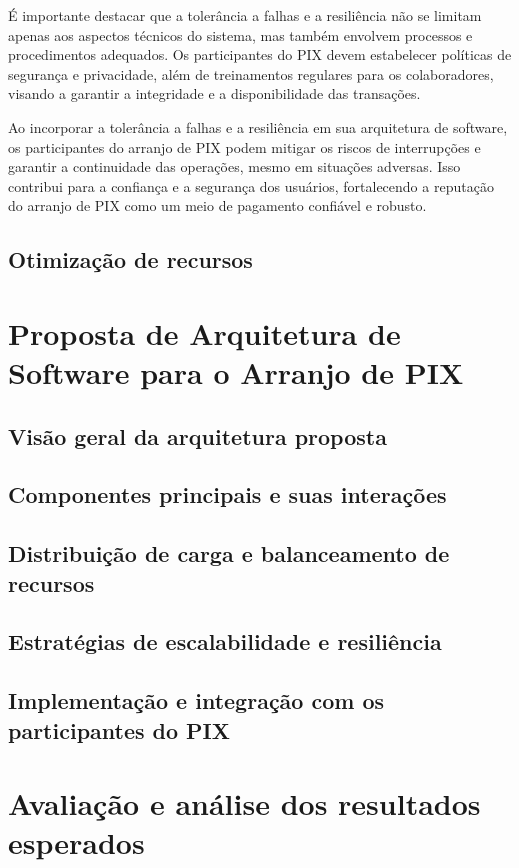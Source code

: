\documentclass[12pt]{article}
\begin{document}
É importante destacar que a tolerância a falhas e a resiliência não se limitam apenas aos aspectos técnicos do sistema, mas também envolvem processos e procedimentos adequados. Os participantes do PIX devem estabelecer políticas de segurança e privacidade, além de treinamentos regulares para os colaboradores, visando a garantir a integridade e a disponibilidade das transações.

Ao incorporar a tolerância a falhas e a resiliência em sua arquitetura de software, os participantes do arranjo de PIX podem mitigar os riscos de interrupções e garantir a continuidade das operações, mesmo em situações adversas. Isso contribui para a confiança e a segurança dos usuários, fortalecendo a reputação do arranjo de PIX como um meio de pagamento confiável e robusto.
\subsection{Otimização de recursos} \label{subsec:tecnologia}

\section{Proposta de Arquitetura de Software para o Arranjo de PIX} \label{sec:proposta}
\subsection{Visão geral da arquitetura proposta} \label{subsec:proposta}
\subsection{Componentes principais e suas interações} \label{subsec:proposta}
\subsection{Distribuição de carga e balanceamento de recursos} \label{sec:proposta}
\subsection{Estratégias de escalabilidade e resiliência} \label{sec:proposta}
\subsection{Implementação e integração com os participantes do PIX} \label{sec:proposta}

\section{Avaliação e análise dos resultados esperados} \label{sec:analise}
\end{document}
